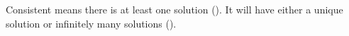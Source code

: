 Consistent means there is at least one solution ().  It will have either a unique solution or infinitely many solutions ().
